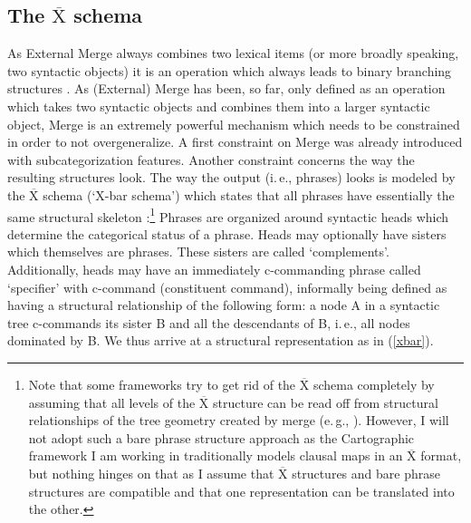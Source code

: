 \subsection{The $\overline{\textrm{X}}$ schema}
As External Merge always combines two lexical items (or more broadly speaking, two syntactic objects) it is an operation which always leads to binary branching structures \citep{kaynel984}. As (External) Merge has been, so far, only defined as an operation which takes two syntactic objects and combines them into a larger syntactic object, Merge is an extremely powerful mechanism which needs to be constrained in order to not overgeneralize. A first constraint on Merge was already introduced with subcategorization features. Another constraint concerns the way the resulting structures look. The way the output (i.\,e., phrases) looks is modeled by the $\overline{\textrm{X}}$ schema (`X-bar schema') which states that all phrases have essentially the same structural skeleton \citep{jackendoff1977x,chomsky1986barr}:\footnote{ Note that some frameworks try to get rid of the $\overline{\textrm{X}}$ schema completely by assuming that all levels of the $\overline{\textrm{X}}$ structure can be read off from structural relationships of the tree geometry created by merge (e.\,g., \citealt{chomsky1995bare}). However, I will not adopt such a bare phrase structure approach as the Cartographic framework I am working in traditionally models clausal maps in an $\overline{\textrm{X}}$ format, but nothing hinges on that as I assume that $\overline{\textrm{X}}$ structures and bare phrase structures are compatible and that one representation can be translated into the other.} Phrases are organized around syntactic heads which determine the categorical status of a phrase. Heads may optionally have sisters which themselves are phrases. These sisters are called `complements'. Additionally, heads may have an immediately c-commanding phrase called `specifier' with c-command (constituent command), informally being defined as having a structural relationship of the following form: a node A in a syntactic tree c-commands its sister B and all the descendants of B, i.\,e., all nodes dominated by B. We thus arrive at a structural representation as in (\ref{xbar}). 

\begin{exe}
\ex\label{xbar} 
\end{exe}

